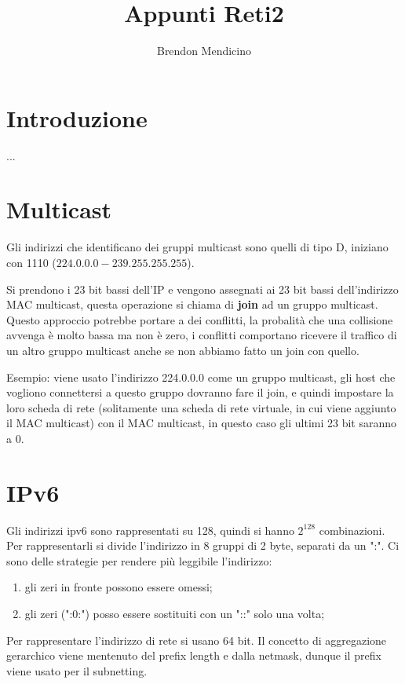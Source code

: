 \documentclass[12pt]{article}
\title{Appunti Reti2}
\author{Brendon Mendicino}
\begin{document}
\maketitle
\newpage
\tableofcontents
\newpage


\section{Introduzione}\label{sec:introduzione}
...


\section{Multicast}
Gli indirizzi che identificano dei gruppi multicast sono quelli di tipo D, iniziano con 1110 ($224.0.0.0 - 239.255.255.255$).

Si prendono i 23 bit bassi dell'IP e vengono assegnati ai 23 bit bassi dell'indirizzo MAC multicast, questa operazione si chiama di \textbf{join} ad un gruppo multicast. Questo approccio potrebbe portare a dei conflitti, la probalit\`a che una collisione avvenga \`e molto bassa ma non \`e zero, i conflitti comportano ricevere il traffico di un altro gruppo multicast anche se non abbiamo fatto un join con quello.

Esempio: viene usato l'indirizzo 224.0.0.0 come un gruppo multicast, gli host che vogliono connettersi a questo gruppo dovranno fare il join, e quindi impostare la loro scheda di rete (solitamente una scheda di rete virtuale, in cui viene aggiunto il MAC multicast) con il MAC multicast, in questo caso gli ultimi 23 bit saranno a 0.


\newpage
\section{IPv6}
Gli indirizzi ipv6 sono rappresentati su 128, quindi si hanno $2^{128}$ combinazioni. Per rappresentarli si divide l'indirizzo in 8 gruppi di 2 byte, separati da un ":". Ci sono delle strategie per rendere pi\`u leggibile l'indirizzo:
\begin{enumerate}
    \item gli zeri in fronte possono essere omessi;
    \item gli zeri (":0:") posso essere sostituiti con un "::" solo una volta;
\end{enumerate}

Per rappresentare l'indirizzo di rete si usano 64 bit. Il concetto di aggregazione gerarchico viene mentenuto del prefix length e dalla netmask, dunque il prefix viene usato per il subnetting.
\end{document}
